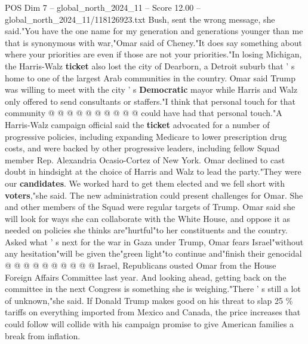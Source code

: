 \begin{textsample}{POS Dim 7 – global\_north\_2024\_11 – Score 12.00 – global\_north\_2024\_11/118126923.txt}
Bush, sent the wrong message, she said."You have the one name for my generation and generations younger than me that is synonymous with war,"Omar said of Cheney."It does say something about where your priorities are even if those are not your priorities."In losing Michigan, the Harris-Walz \textbf{ticket} also lost the city of Dearborn, a Detroit suburb that ' s home to one of the largest Arab communities in the country.
Omar said Trump was willing to meet with the city ' s \textbf{Democratic} mayor while Harris and Walz only offered to send consultants or staffers."I think that personal touch for that community @ @ @ @ @ @ @ @ @ @ could have had that personal touch."A Harris-Walz campaign official said the \textbf{ticket} advocated for a number of progressive policies, including expanding Medicare to lower prescription drug costs, and were backed by other progressive leaders, including fellow Squad member Rep.
Alexandria Ocasio-Cortez of New York.
Omar declined to cast doubt in hindsight at the choice of Harris and Walz to lead the party."They were our \textbf{candidates}.
We worked hard to get them elected and we fell short with \textbf{voters},"she said.
The new administration could present challenges for Omar.
She and other members of the Squad were regular targets of Trump.
Omar said she will look for ways she can collaborate with the White House, and oppose it as needed on policies she thinks are"hurtful"to her constituents and the country.
Asked what ' s next for the war in Gaza under Trump, Omar fears Israel"without any hesitation"will be given the"green light"to continue and"finish their genocidal @ @ @ @ @ @ @ @ @ @ Israel, Republicans ousted Omar from the House Foreign Affairs Committee last year.
And looking ahead, getting back on the committee in the next Congress is something she is weighing."There ' s still a lot of unknown,"she said.
If Donald Trump makes good on his threat to slap 25 \% tariffs on everything imported from Mexico and Canada, the price increases that could follow will collide with his campaign promise to give American families a break from inflation.

\end{textsample}
